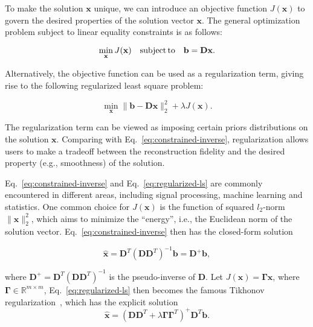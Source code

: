 To make the solution $\mathbf{x}$ unique, we can introduce an objective function
$J(\mathbf{x})$ to govern the desired properties of the solution vector $\mathbf{x}$.
The general optimization problem subject to linear equality constraints is as follows:

\begin{equation}
\label{eq:constrained-inverse}
\min_\mathbf{x} J(\mathbf{x}) \quad \text{subject\,to} \quad \mathbf{b}=\mathbf{D}\mathbf{x}.
\end{equation}

Alternatively, the objective function can be used as a regularization term, giving rise to
the following regularized least square problem:

\begin{equation}
\label{eq:regularized-ls}
\min_\mathbf{x} \|\mathbf{b}-\mathbf{D}\mathbf{x}\|_2^2 + \lambda J(\mathbf{x}).
\end{equation}

The regularization term can be viewed as imposing certain priors distributions on
the solution $\mathbf{x}$. Comparing with Eq.~\ref{eq:constrained-inverse}, regularization
allows users to make a tradeoff between the reconstruction fidelity and the
desired property (e.g., smoothness) of the solution.

Eq.~\ref{eq:constrained-inverse} and Eq.~\ref{eq:regularized-ls} are commonly encountered in different
areas, including signal processing, machine learning and statistics. One common choice for $J(\mathbf{x})$
is the function of squared $l_2$-norm $\|\mathbf{x}\|_2^2$, which aims to minimize the ``energy'',
i.e., the Euclidean norm of the solution vector. Eq.~\ref{eq:constrained-inverse} then has the closed-form solution

\begin{equation}
\hat{\mathbf{x}}=\mathbf{D}^T(\mathbf{D}\mathbf{D}^T)^{-1}\mathbf{b}=\mathbf{D}^{+}\mathbf{b},
\end{equation}

where $\mathbf{D}^{+}=\mathbf{D}^T(\mathbf{D}\mathbf{D}^T)^{-1}$ is the
pseudo-inverse of $\mathbf{D}$. Let $J(\mathbf{x})=\mathbf{\Gamma}\mathbf{x}$,
where $\mathbf{\Gamma}\in\mathbb{R}^{m\times m}$, Eq.~\ref{eq:regularized-ls}
then becomes the famous Tikhonov regularization~\cite{Golub1999}, which has the
explicit solution
\begin{equation}
\hat{\mathbf{x}} = (\mathbf{D}\mathbf{D}^T + \lambda \mathbf{\Gamma}\mathbf{\Gamma}^T)^{+}\mathbf{D}^T\mathbf{b}.
\end{equation}

